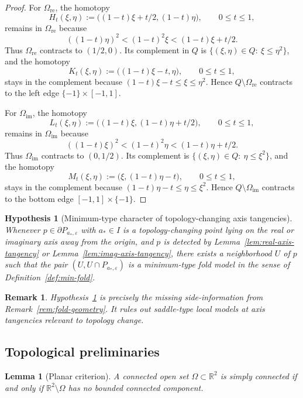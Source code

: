 \documentclass[11pt]{article}
\newtheorem{lemma}[theorem]{Lemma}
\newtheorem{remark}[theorem]{Remark}
\newtheorem{hypothesis}[theorem]{Hypothesis}
\newcommand{\R}{\mathbb{R}}
\begin{document}
\begin{proof}
For \(\Omega_{\mathrm{re}}\), the homotopy
\[
H_t(\xi,\eta):=\bigl((1-t)\xi+t/2,(1-t)\eta\bigr),
\qquad 0\le t\le 1,
\]
remains in \(\Omega_{\mathrm{re}}\) because
\[
((1-t)\eta)^2<(1-t)^2\xi<(1-t)\xi+t/2.
\]
Thus \(\Omega_{\mathrm{re}}\) contracts to \((1/2,0)\). Its complement in \(Q\) is \(\{(\xi,\eta)\in Q:\ \xi\le \eta^2\}\), and the homotopy
\[
K_t(\xi,\eta):=\bigl((1-t)\xi-t,\eta\bigr),
\qquad 0\le t\le 1,
\]
stays in the complement because \((1-t)\xi-t\le \xi\le \eta^2\). Hence \(Q\setminus\Omega_{\mathrm{re}}\) contracts to the left edge \(\{-1\}\times[-1,1]\).

For \(\Omega_{\mathrm{im}}\), the homotopy
\[
L_t(\xi,\eta):=\bigl((1-t)\xi,(1-t)\eta+t/2\bigr),
\qquad 0\le t\le 1,
\]
remains in \(\Omega_{\mathrm{im}}\) because
\[
((1-t)\xi)^2<(1-t)^2\eta<(1-t)\eta+t/2.
\]
Thus \(\Omega_{\mathrm{im}}\) contracts to \((0,1/2)\). Its complement is \(\{(\xi,\eta)\in Q:\ \eta\le \xi^2\}\), and the homotopy
\[
M_t(\xi,\eta):=\bigl(\xi,(1-t)\eta-t\bigr),
\qquad 0\le t\le 1,
\]
stays in the complement because \((1-t)\eta-t\le \eta\le \xi^2\). Hence \(Q\setminus\Omega_{\mathrm{im}}\) contracts to the bottom edge \([-1,1]\times\{-1\}\).
\end{proof}

\begin{hypothesis}[Minimum-type character of topology-changing axis tangencies]\label{hyp:min-fold}
Whenever \(p\in\partial P_{a_*,\varepsilon}\) with \(a_*\in I\) is a topology-changing point lying on the real or imaginary axis away from the origin, and \(p\) is detected by Lemma~\ref{lem:real-axis-tangency} or Lemma~\ref{lem:imag-axis-tangency}, there exists a neighborhood \(U\) of \(p\) such that the pair \((U,U\cap P_{a_*,\varepsilon})\) is a minimum-type fold model in the sense of Definition~\ref{def:min-fold}.
\end{hypothesis}

\begin{remark}
Hypothesis~\ref{hyp:min-fold} is precisely the missing side-information from Remark~\ref{rem:fold-geometry}. It rules out saddle-type local models at axis tangencies relevant to topology change.
\end{remark}

\subsection*{Topological preliminaries}

\begin{lemma}[Planar criterion]\label{lem:planar-criterion}
A connected open set \(\Omega\subset\R^2\) is simply connected if and only if \(\R^2\setminus\Omega\) has no bounded connected component.
\end{lemma}
\end{document}
